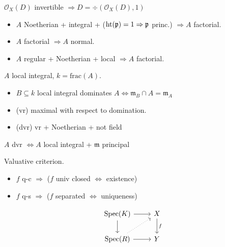 \begin{proposition} $ \mathcal{O}_X(D) $ invertible $ \Rightarrow D = \div ( \mathcal{O}_X(D), 1) $
\end{proposition}

\begin{proposition} 
   \begin{itemize}[topsep=-6pt, itemsep=0pt]
    \item $A$ Noetherian + integral + ($\operatorname{ht} (\mathfrak{p}) = 1 \Rightarrow \mathfrak{p}$ princ.) $ \Rightarrow A $ factorial.
    \item $A$ factorial $ \Rightarrow A$ normal.
    \item $A$ regular + Noetherian + local $ \Rightarrow A $ factorial.
   \end{itemize}    
\end{proposition}

\begin{definition} $A$ local integral, $k = \text{frac}(A)$.
\begin{itemize}[topsep=-6pt, itemsep=0pt]
    \item $B \subseteq k$ local integral dominates $A \Leftrightarrow \mathfrak{m}_B \cap A = \mathfrak{m}_A$
    \item (vr) maximal with respect to domination.
    \item (dvr) vr + Noetherian + not field
\end{itemize}
\end{definition}

\begin{proposition}
$A$ dvr $ \Leftrightarrow A$ local integral + $\mathfrak{m}$ principal
\end{proposition}

\begin{minipage}{0.45\columnwidth}
\begin{proposition} Valuative criterion.
\begin{itemize}[topsep=-6pt, itemsep=0pt]
    \item $f$ q-c $ \Rightarrow $ ($f$ univ closed $ \Leftrightarrow $ existence)
    \item $f$ q-s $ \Rightarrow $ ($f$ separated $ \Leftrightarrow $ uniqueness)
\end{itemize}
\end{proposition}
\end{minipage}
\begin{minipage}{0.45\columnwidth}
\[\begin{tikzcd}
	{\text{Spec}(K)} & X \\
	{\text{Spec}(R)} & Y
	\arrow[from=1-1, to=1-2]
	\arrow[from=1-1, to=2-1]
	\arrow["f", from=1-2, to=2-2]
	\arrow[dotted, from=2-1, to=1-2]
	\arrow[from=2-1, to=2-2]
\end{tikzcd}\]
\end{minipage}


